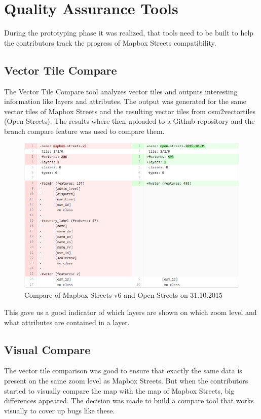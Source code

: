 \section{Quality Assurance Tools}\label{tools}
During the prototyping phase it was realized, that tools need to be built to help the contributors track the progress of Mapbox Streets compatibility.

\subsection{Vector Tile Compare}\label{vector_tile_compare}
The Vector Tile Compare tool analyzes vector tiles and outputs interesting information like layers and attributes. 
The output was generated for the same vector tiles of Mapbox Streets and the resulting vector tiles from osm2vectortiles (Open Streets).
The results where then uploaded  to a Github repository and the branch compare feature was used to compare them. 

\begin{figure}[H]
  \centering
  \includegraphics[width=1\textwidth]{images/vector_tile_compare.png}
  \caption{Compare of Mapbox Streets v6 and Open Streets on 31.10.2015}
\end{figure}

This gave us a good indicator of which layers are shown on which zoom level and what attributes are contained in a layer.

\subsection{Visual Compare}\label{visual_compare}
The vector tile comparison was good to ensure that exactly the same data is present on the same zoom level as Mapbox Streets.
But when the contributors started to visually compare the map with the map of Mapbox Streets, big differences appeared.
The decision was made to build a compare tool that works visually to cover up bugs like these.

